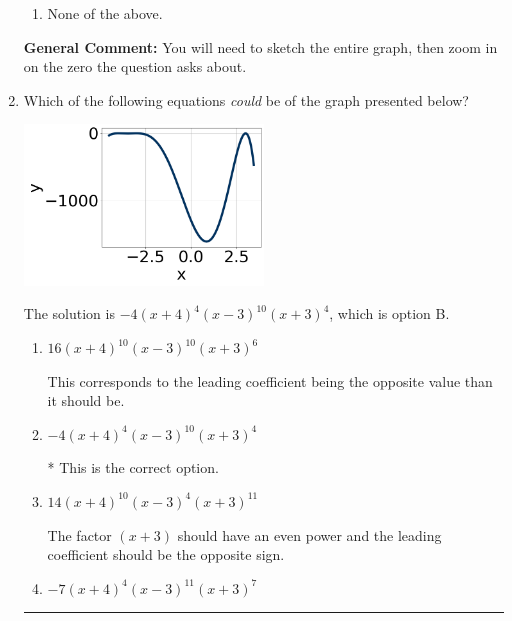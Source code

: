 \documentclass{extbook}[14pt]
\newcommand{\litem}[1]{\item #1

\rule{\textwidth}{0.4pt}}
\begin{document}
\begin{enumerate}
{\begin{enumerate}[label=\Alph*.]
\item None of the above.\end{enumerate}
\textbf{General Comment:} You will need to sketch the entire graph, then zoom in on the zero the question asks about.
}
\litem{
Which of the following equations \textit{could} be of the graph presented below?

\begin{center}
    \includegraphics[width=0.5\textwidth]{../Figures/polyGraphToFunctionC.png}
\end{center}


The solution is \( -4(x + 4)^{4} (x - 3)^{10} (x + 3)^{4} \), which is option B.\begin{enumerate}[label=\Alph*.]
\item \( 16(x + 4)^{10} (x - 3)^{10} (x + 3)^{6} \)

This corresponds to the leading coefficient being the opposite value than it should be.
\item \( -4(x + 4)^{4} (x - 3)^{10} (x + 3)^{4} \)

* This is the correct option.
\item \( 14(x + 4)^{10} (x - 3)^{4} (x + 3)^{11} \)

The factor $(x + 3)$ should have an even power and the leading coefficient should be the opposite sign.
\item \( -7(x + 4)^{4} (x - 3)^{11} (x + 3)^{7} \)


\end{enumerate}}
\end{enumerate}
\end{document}
